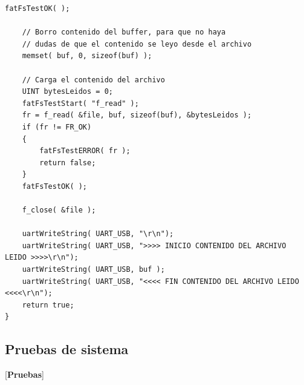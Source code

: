 \begin{lstlisting}[caption={Código para las puebas funcionales para el módulo de almacenamiento.},label={lst:funcional}]
	fatFsTestOK( );

	// Borro contenido del buffer, para que no haya 
	// dudas de que el contenido se leyo desde el archivo
	memset( buf, 0, sizeof(buf) );

	// Carga el contenido del archivo
	UINT bytesLeidos = 0;
	fatFsTestStart( "f_read" );
	fr = f_read( &file, buf, sizeof(buf), &bytesLeidos );
	if (fr != FR_OK)
	{
		fatFsTestERROR( fr );
		return false;
	}
	fatFsTestOK( );

	f_close( &file );

	uartWriteString( UART_USB, "\r\n");
	uartWriteString( UART_USB, ">>>> INICIO CONTENIDO DEL ARCHIVO LEIDO >>>>\r\n");
	uartWriteString( UART_USB, buf );
	uartWriteString( UART_USB, "<<<< FIN CONTENIDO DEL ARCHIVO LEIDO <<<<\r\n");
	return true;
}
\end{lstlisting}


\subsection{Pruebas de sistema}
\label{subsec:pruebasSistema}

[\textbf{Pruebas}]
